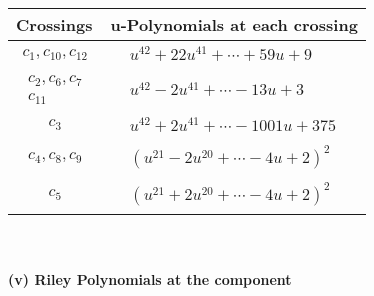 \documentclass[1p]{elsarticle_modified}
\theoremstyle{definition}
\begin{document}
\begin{tabular}{m{50pt}|m{274pt}}
Crossings & \hspace{64pt}u-Polynomials at each crossing \\
\hline $$\begin{aligned}c_{1},c_{10},c_{12}\end{aligned}$$&$\begin{aligned}
&u^{42}+22 u^{41}+\cdots+59 u+9
\end{aligned}$\\
\hline $$\begin{aligned}c_{2},c_{6},c_{7}\\c_{11}\end{aligned}$$&$\begin{aligned}
&u^{42}-2 u^{41}+\cdots-13 u+3
\end{aligned}$\\
\hline $$\begin{aligned}c_{3}\end{aligned}$$&$\begin{aligned}
&u^{42}+2 u^{41}+\cdots-1001 u+375
\end{aligned}$\\
\hline $$\begin{aligned}c_{4},c_{8},c_{9}\end{aligned}$$&$\begin{aligned}
&(u^{21}-2 u^{20}+\cdots-4 u+2)^{2}
\end{aligned}$\\
\hline $$\begin{aligned}c_{5}\end{aligned}$$&$\begin{aligned}
&(u^{21}+2 u^{20}+\cdots-4 u+2)^{2}
\end{aligned}$\\
\hline
\end{tabular}\\~\\
\newpage\renewcommand{\arraystretch}{1}
\flushleft \textbf{(v) Riley Polynomials at the component}\newline \\
\end{document}
